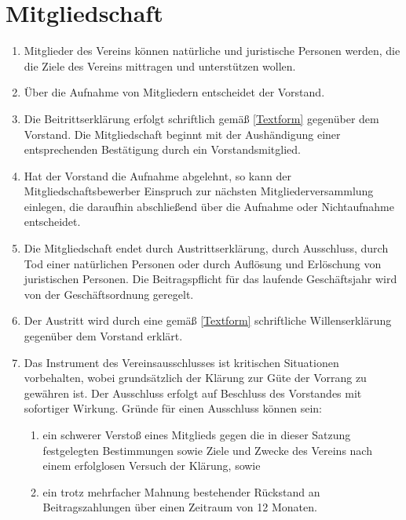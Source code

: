 \documentclass[fontsize=12pt,paper=a4,pagesize,headings=small]{scrartcl}
\begin{document}
\section{Mitgliedschaft}
\begin{enumerate}
    \item Mitglieder des Vereins können natürliche und juristische
    Personen werden, die die Ziele des Vereins mittragen und
    unterstützen wollen.

    \item Über die Aufnahme von Mitgliedern entscheidet der Vorstand.

    \item Die Beitrittserklärung erfolgt schriftlich gemäß
    \ref{Textform} gegenüber dem Vorstand. Die Mitgliedschaft
    beginnt mit der Aushändigung einer entsprechenden Bestätigung durch
    ein Vorstandsmitglied.

    \item Hat der Vorstand die Aufnahme abgelehnt, so kann der
    Mitgliedschaftsbewerber Einspruch zur nächsten
    Mitgliederversammlung einlegen, die daraufhin abschließend über die
    Aufnahme oder Nichtaufnahme entscheidet.

    \item Die Mitgliedschaft endet durch Austrittserklärung, durch
    Ausschluss, durch Tod einer natürlichen Personen oder durch
    Auflösung und Erlöschung von juristischen Personen. Die
    Beitragspflicht für das laufende Geschäftsjahr wird von der
    Geschäftsordnung geregelt.

    \item Der Austritt wird durch eine gemäß \ref{Textform}
    schriftliche Willenserklärung gegenüber dem Vorstand erklärt.

    \item Das Instrument des Vereinsausschlusses ist kritischen
    Situationen vorbehalten, wobei grundsätzlich der Klärung zur Güte
    der Vorrang zu gewähren ist. Der Ausschluss erfolgt auf Beschluss
    des Vorstandes mit sofortiger Wirkung. Gründe für einen Ausschluss
    können sein:
        \begin{enumerate}
            \item ein schwerer Verstoß eines Mitglieds gegen die in
                dieser Satzung festgelegten Bestimmungen sowie Ziele und
                Zwecke des Vereins nach einem erfolglosen Versuch der
                Klärung, sowie
            \item ein trotz mehrfacher Mahnung bestehender Rückstand an
                Beitragszahlungen über einen Zeitraum von 12 Monaten.
        \end{enumerate}


\end{enumerate}
\end{document}
